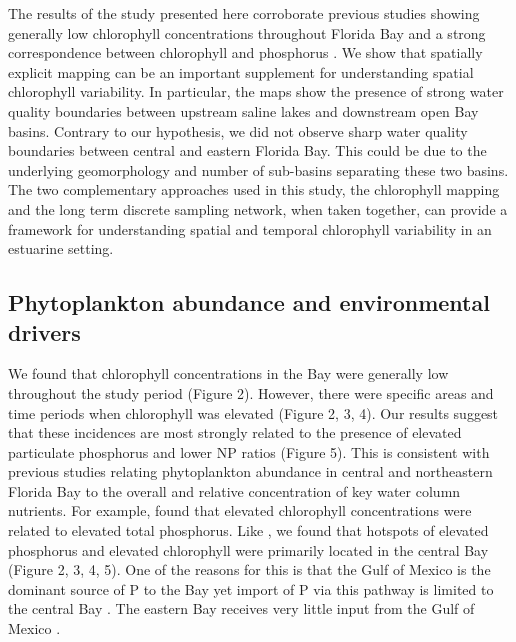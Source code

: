 The results of the study presented here corroborate previous studies showing generally low chlorophyll concentrations throughout Florida Bay and a strong correspondence between chlorophyll and phosphorus \citep{fourqurean1993process, phlips_spatial_1996}. We show that spatially explicit mapping can be an important supplement for understanding spatial chlorophyll variability. In particular, the maps show the presence of strong water quality boundaries between upstream saline lakes and downstream open Bay basins. Contrary to our hypothesis, we did not observe sharp water quality boundaries between central and eastern Florida Bay. This could be due to the underlying geomorphology and number of sub-basins separating these two basins. The two complementary approaches used in this study, the chlorophyll mapping and the long term discrete sampling network, when taken together, can provide a framework for understanding spatial and temporal chlorophyll variability in an estuarine setting. 

\subsection{Phytoplankton abundance and environmental drivers}
\label{phytoabund}

We found that chlorophyll concentrations in the Bay were generally low throughout the study period (Figure 2). However, there were specific areas and time periods when chlorophyll was elevated (Figure 2, 3, 4). Our results suggest that these incidences are most strongly related to the presence of elevated particulate phosphorus and lower NP ratios (Figure 5). This is consistent with previous studies relating phytoplankton abundance in central and northeastern Florida Bay to the overall and relative concentration of key water column nutrients. For example, \citet{fourqurean1993process} found that elevated chlorophyll concentrations were related to elevated total phosphorus. Like \citet{fourqurean1993process}, we found that hotspots of elevated phosphorus and elevated chlorophyll were primarily located in the central Bay (Figure 2, 3, 4, 5). One of the reasons for this is that the Gulf of Mexico is the dominant source of P to the Bay yet import of P via this pathway is limited to the central Bay \citep{childers_relating_2006, rudnick1999phosphorus}. The eastern Bay receives very little input from the Gulf of Mexico \citep{lee2016circulation}. 

